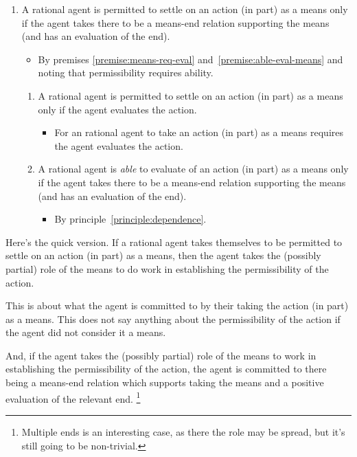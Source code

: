 \documentclass[10pt]{article}
\newcommand{\hozlinedash}[0]{%
  \noindent\hdashrule[0.5ex][c]{\textwidth}{.1pt}{2.5pt}
}
\begin{document}
\begin{enumerate}[label=P\arabic*., ref=(P\arabic*)]
\item A rational agent is permitted to settle on an action (in part) as a means only if the agent takes there to be a means-end relation supporting the means (and has an evaluation of the end).
    \begin{itemize}
    \item By premises \ref{premise:means-req-eval} and~\ref{premise:able-eval-means} and noting that permissibility requires ability.
    \end{itemize}
  \begin{enumerate}[label=P\arabic{enumi}\alph*., ref=(P\arabic{enumi}\alph*)]
  \item A rational agent is permitted to settle on an action (in part) as a means only if the agent evaluates the action.
    \begin{itemize}
    \item For an rational agent to take an action (in part) as a means requires the agent evaluates the action.
    \end{itemize}
  \item A rational agent is \emph{able} to evaluate of an action (in part) as a means only if the agent takes there to be a means-end relation supporting the means (and has an evaluation of the end).
    \begin{itemize}
    \item By principle~\ref{principle:dependence}.
    \end{itemize}
  \end{enumerate}
\end{enumerate}

\hozlinedash

Here's the quick version.
If a rational agent takes themselves to be permitted to settle on an action (in part) as a means, then the agent takes the (possibly partial) role of the means to do work in establishing the permissibility of the action.

This is about what the agent is committed to by their taking the action (in part) as a means.
This does not say anything about the permissibility of the action if the agent did not consider it a means.

And, if the agent takes the (possibly partial) role of the means to work in establishing the permissibility of the action, the agent is committed to there being a means-end relation which supports taking the means and a positive evaluation of the relevant end.\nolinebreak
\footnote{Multiple ends is an interesting case, as there the role may be spread, but it's still going to be non-trivial.}
\end{document}
